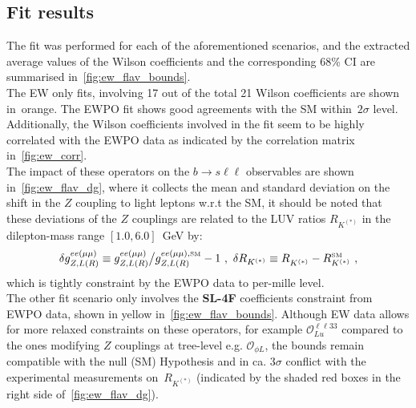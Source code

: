 \subsection{Fit results}
\label{sec:EFT_results}
The fit was performed for each of the aforementioned scenarios, and the extracted average values of the Wilson coefficients and the corresponding 68\% CI are summarised in~\autoref{fig:ew_flav_bounds}.\\ The EW only fits, involving 17 out of the total 21 Wilson coefficients are shown in~\textcolor[HTML]{be3d04}{orange}. The EWPO fit shows good agreements with the SM within~$2\sigma$ level. Additionally, the Wilson coefficients involved in the fit seem to be highly correlated with the EWPO data as indicated by the correlation matrix in~\autoref{fig:ew_corr}. \\
The impact of these operators on the $ b \to s \ell \ell$ observables are shown in~\autoref{fig:ew_flav_dg}, where  it collects the mean and standard deviation on the shift in the $Z$ coupling to light leptons w.r.t the SM, it should be noted that these deviations of the $Z$ couplings are related to the LUV ratios   $R_{K^{(*)}}$ in the dilepton-mass range $[1.0,6.0]$~GeV by: 
\begin{equation}
	\label{eq:SMdev}
	\delta g_{Z,L(R)}^{ee(\mu\mu)} \equiv g_{Z,L(R)}^{ee(\mu\mu)}{\big/}g_{Z,L(R)}^{ee(\mu\mu),\textrm{\tiny SM}}-1  \ , \ \delta R_{K^{(*)}} \equiv R_{K^{(*)}}^{ } - R_{K^{(*)}}^{\textrm{\tiny SM}} \ ,
\end{equation}
which is tightly constraint by the EWPO data to per-mille level. \\
The other fit scenario only involves the \textbf{ SL-4F} coefficients constraint from EWPO data, shown in \textcolor[HTML]{c2b109}{yellow}  in~\autoref{fig:ew_flav_bounds}. Although EW data allows for more relaxed constraints on these operators, for example $\mathcal{O}_{Lu}^{\ell \ell 33}$ compared to the ones modifying $Z$ couplings at tree-level e.g. $\mathcal{O}_{\phi L}$, the bounds remain compatible with the null (SM) Hypothesis and in ca. $3\sigma$ conflict with the experimental measurements on~$R_{K^{(*)}}$  (indicated by the shaded red boxes in the right side of~\autoref{fig:ew_flav_dg}).  
\\
